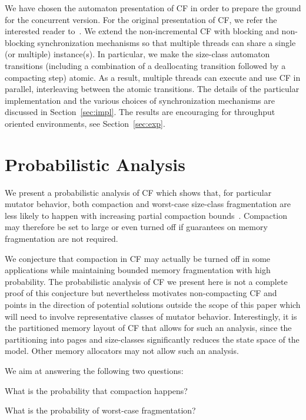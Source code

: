 \documentclass{amsart}
\begin{document}
We have chosen the automaton presentation of CF in order to prepare
the ground for the concurrent version. For the original presentation
of CF, we refer the interested reader to~\cite{USENIX08}.  We extend
the non-incremental CF with blocking and non-blocking synchronization
mechanisms so that multiple threads can share a single (or multiple)
instance(s). In particular, we make the size-class automaton
transitions (including a combination of a deallocating transition
followed by a compacting step) atomic. As a result, multiple threads
can execute and use CF in parallel, interleaving between the atomic
transitions. The details of the particular implementation and the
various choices of synchronization mechanisms are discussed in
Section~\ref{sec:impl}. The results are encouraging for throughput
oriented environments, see Section~\ref{sec:exp}.




\section{Probabilistic Analysis}
\label{sec:prob}

We present a probabilistic analysis of CF which shows that, for
{particular} mutator behavior, both compaction and worst-case
size-class fragmentation are less likely to happen with increasing
partial compaction bounds~.  Compaction may therefore be set
to large  or even turned off if guarantees on memory
fragmentation are not required.

{We conjecture that compaction in CF may actually be turned off
  in some applications while maintaining bounded
  memory fragmentation with high probability.  The probabilistic
  analysis of CF we present here is not a complete proof of this
  conjecture but nevertheless motivates non-compacting CF and points
  in the direction of potential solutions outside the scope of this
  paper which will need to involve representative classes of mutator
  behavior.}
Interestingly, it is the partitioned memory layout of CF that allows
for such an analysis, since the partitioning into pages and
size-classes significantly reduces the state space of the model.
Other memory allocators may not allow such an analysis.

We aim at answering the following two questions:
\begin{list}{}{\leftmargin=1.2em}
\item[1.] What is the probability that compaction happens?
\item[2.] What is the probability of  worst-case fragmentation?
\end{list}
\end{document}
